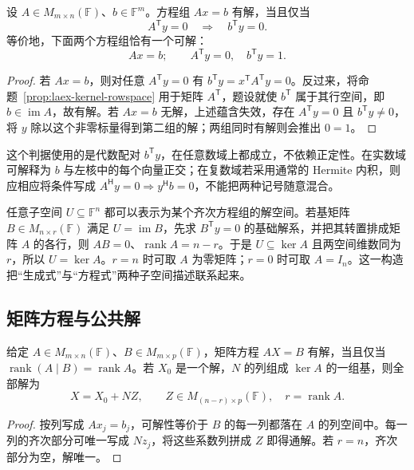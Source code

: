 \begin{theorem}
\label{thm:laex-solvability-alternative}
设 $A\in M_{m\times n}(\mathbb F)$、$b\in\mathbb F^m$。方程组 $Ax=b$ 有解，当且仅当
\begin{equation}
\label{eq:laex-solvability-dual}
A^{\mathsf T}y=0\quad\Longrightarrow\quad b^{\mathsf T}y=0.
\end{equation}
等价地，下面两个方程组恰有一个可解：
\[
Ax=b;\qquad
A^{\mathsf T}y=0,\quad b^{\mathsf T}y=1.
\]
\end{theorem}

\begin{proof}
若 $Ax=b$，则对任意 $A^{\mathsf T}y=0$ 有 $b^{\mathsf T}y=x^{\mathsf T}A^{\mathsf T}y=0$。反过来，将命题~\ref{prop:laex-kernel-rowspace} 用于矩阵 $A^{\mathsf T}$，题设就使 $b^{\mathsf T}$ 属于其行空间，即 $b\in\operatorname{im}A$，故有解。若 $Ax=b$ 无解，上述蕴含失效，存在 $A^{\mathsf T}y=0$ 且 $b^{\mathsf T}y\ne0$，将 $y$ 除以这个非零标量得到第二组的解；两组同时有解则会推出 $0=1$。
\end{proof}

这个判据使用的是代数配对 $b^{\mathsf T}y$，在任意数域上都成立，不依赖正定性。在实数域可解释为 $b$ 与左核中的每个向量正交；在复数域若采用通常的 Hermite 内积，则应相应将条件写成 $A^{\mathsf H}y=0\Rightarrow y^{\mathsf H}b=0$，不能把两种记号随意混合。

任意子空间 $U\subseteq\mathbb F^n$ 都可以表示为某个齐次方程组的解空间。若基矩阵 $B\in M_{n\times r}(\mathbb F)$ 满足 $U=\operatorname{im}B$，先求 $B^{\mathsf T}y=0$ 的基础解系，并把其转置排成矩阵 $A$ 的各行，则 $AB=0$、$\operatorname{rank}A=n-r$。于是 $U\subseteq\ker A$ 且两空间维数同为 $r$，所以 $U=\ker A$。$r=n$ 时可取 $A$ 为零矩阵；$r=0$ 时可取 $A=I_n$。这一构造把“生成式”与“方程式”两种子空间描述联系起来。

\subsection{矩阵方程与公共解}

\begin{proposition}
\label{prop:laex-matrix-system}
给定 $A\in M_{m\times n}(\mathbb F)$、$B\in M_{m\times p}(\mathbb F)$，矩阵方程 $AX=B$ 有解，当且仅当 $\operatorname{rank}(A\mid B)=\operatorname{rank}A$。若 $X_0$ 是一个解，$N$ 的列组成 $\ker A$ 的一组基，则全部解为
\[
X=X_0+NZ,\qquad Z\in M_{(n-r)\times p}(\mathbb F),\quad r=\operatorname{rank}A.
\]
\end{proposition}

\begin{proof}
按列写成 $Ax_j=b_j$，可解性等价于 $B$ 的每一列都落在 $A$ 的列空间中。每一列的齐次部分可唯一写成 $Nz_j$，将这些系数列拼成 $Z$ 即得通解。若 $r=n$，齐次部分为空，解唯一。
\end{proof}

